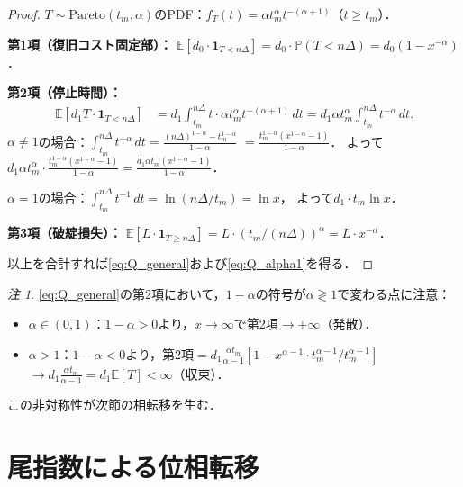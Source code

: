 \documentclass[12pt,a4paper]{article}
\theoremstyle{plain}
\theoremstyle{definition}
\theoremstyle{remark}
\newtheorem{remark}[theorem]{注}
\newcommand{\E}{\mathbb{E}}
\newcommand{\Prob}{\mathbb{P}}
\begin{document}
\begin{proof}
$T\sim\mathrm{Pareto}(t_m,\alpha)$のPDF：$f_T(t)=\alpha t_m^\alpha t^{-(\alpha+1)}$（$t\ge t_m$）．

\textbf{第1項（復旧コスト固定部）：}
$\E[d_0\cdot\mathbf{1}_{T<n\Delta}]=d_0\cdot\Prob(T<n\Delta)=d_0(1-x^{-\alpha})$．

\textbf{第2項（停止時間）：}
\begin{align*}
\E[d_1 T\cdot\mathbf{1}_{T<n\Delta}]
&= d_1\int_{t_m}^{n\Delta}t\cdot\alpha t_m^\alpha t^{-(\alpha+1)}\,dt
= d_1\alpha t_m^\alpha\int_{t_m}^{n\Delta}t^{-\alpha}\,dt.
\end{align*}
$\alpha\ne1$の場合：$\int_{t_m}^{n\Delta}t^{-\alpha}\,dt=\frac{(n\Delta)^{1-\alpha}-t_m^{1-\alpha}}{1-\alpha}$
$=\frac{t_m^{1-\alpha}(x^{1-\alpha}-1)}{1-\alpha}$．
よって$d_1\alpha t_m^\alpha\cdot\frac{t_m^{1-\alpha}(x^{1-\alpha}-1)}{1-\alpha}
=\frac{d_1\alpha t_m(x^{1-\alpha}-1)}{1-\alpha}$．

$\alpha=1$の場合：$\int_{t_m}^{n\Delta}t^{-1}\,dt=\ln(n\Delta/t_m)=\ln x$，
よって$d_1\cdot t_m\ln x$．

\textbf{第3項（破綻損失）：}
$\E[L\cdot\mathbf{1}_{T\ge n\Delta}]=L\cdot(t_m/(n\Delta))^\alpha=L\cdot x^{-\alpha}$．

以上を合計すれば\eqref{eq:Q_general}および\eqref{eq:Q_alpha1}を得る．
\end{proof}

\begin{remark}
\eqref{eq:Q_general}の第2項において，$1-\alpha$の符号が$\alpha\gtrless1$で変わる点に注意：
\begin{itemize}
\item $\alpha\in(0,1)$：$1-\alpha>0$より，$x\to\infty$で第2項$\to+\infty$（発散）．
\item $\alpha>1$：$1-\alpha<0$より，第2項$=d_1\frac{\alpha t_m}{\alpha-1}[1-x^{\alpha-1}\cdot t_m^{\alpha-1}/t_m^{\alpha-1}]$
  $\to d_1\frac{\alpha t_m}{\alpha-1}=d_1\E[T]<\infty$（収束）．
\end{itemize}
この非対称性が次節の相転移を生む．
\end{remark}

\section{尾指数による位相転移}
\label{sec:phase}
\end{document}
